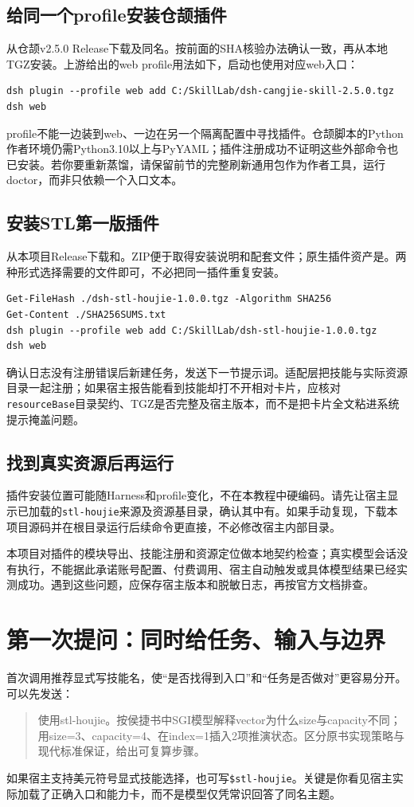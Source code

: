 \documentclass[11pt,a4paper,fontset=fandol]{ctexart}
\begin{document}
\subsection{给同一个profile安装仓颉插件}
从仓颉v2.5.0 Release下载及同名。按前面的SHA核验办法确认一致，再从本地TGZ安装。上游给出的web profile用法如下，启动也使用对应web入口：
\begin{lstlisting}
dsh plugin --profile web add C:/SkillLab/dsh-cangjie-skill-2.5.0.tgz
dsh web
\end{lstlisting}
profile不能一边装到web、一边在另一个隔离配置中寻找插件。仓颉脚本的Python作者环境仍需Python3.10以上与PyYAML；插件注册成功不证明这些外部命令也已安装。若你要重新蒸馏，请保留前节的完整刷新通用包作为作者工具，运行doctor，而非只依赖一个入口文本。

\subsection{安装STL第一版插件}
从本项目Release下载和。ZIP便于取得安装说明和配套文件；原生插件资产是。两种形式选择需要的文件即可，不必把同一插件重复安装。
\begin{lstlisting}
Get-FileHash ./dsh-stl-houjie-1.0.0.tgz -Algorithm SHA256
Get-Content ./SHA256SUMS.txt
dsh plugin --profile web add C:/SkillLab/dsh-stl-houjie-1.0.0.tgz
dsh web
\end{lstlisting}
确认日志没有注册错误后新建任务，发送下一节提示词。适配层把技能与实际资源目录一起注册；如果宿主报告能看到技能却打不开相对卡片，应核对\texttt{resourceBase}目录契约、TGZ是否完整及宿主版本，而不是把卡片全文粘进系统提示掩盖问题。

\subsection{找到真实资源后再运行}
插件安装位置可能随Harness和profile变化，不在本教程中硬编码。请先让宿主显示已加载的\texttt{stl-houjie}来源及资源基目录，确认其中有。如果手动复现，下载本项目源码并在根目录运行后续命令更直接，不必修改宿主内部目录。

本项目对插件的模块导出、技能注册和资源定位做本地契约检查；真实模型会话没有执行，不能据此承诺账号配置、付费调用、宿主自动触发或具体模型结果已经实测成功。遇到这些问题，应保存宿主版本和脱敏日志，再按官方文档排查。
\section{第一次提问：同时给任务、输入与边界}
首次调用推荐显式写技能名，使“是否找得到入口”和“任务是否做对”更容易分开。可以先发送：
\begin{quote}
使用stl-houjie。按侯捷书中SGI模型解释vector为什么size与capacity不同；用size=3、capacity=4、在index=1插入2项推演状态。区分原书实现策略与现代标准保证，给出可复算步骤。
\end{quote}
如果宿主支持美元符号显式技能选择，也可写\texttt{\$stl-houjie}。关键是你看见宿主实际加载了正确入口和能力卡，而不是模型仅凭常识回答了同名主题。
\end{document}
